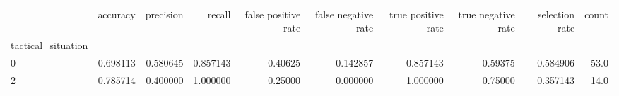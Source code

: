 \begin{tabular}{lrrrrrrrrr}
\toprule
{} &  accuracy &  precision &    recall &  false positive rate &  false negative rate &  true positive rate &  true negative rate &  selection rate &  count \\
tactical\_situation &           &            &           &                      &                      &                     &                     &                 &        \\
\midrule
0                  &  0.698113 &   0.580645 &  0.857143 &              0.40625 &             0.142857 &            0.857143 &             0.59375 &        0.584906 &   53.0 \\
2                  &  0.785714 &   0.400000 &  1.000000 &              0.25000 &             0.000000 &            1.000000 &             0.75000 &        0.357143 &   14.0 \\
\bottomrule
\end{tabular}

